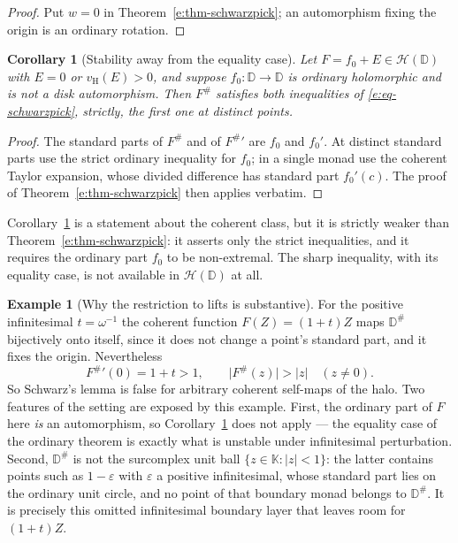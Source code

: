 \documentclass[11pt,a4paper]{article}
\numberwithin{equation}{section}
\newtheorem{corollary}[theorem]{Corollary}
\theoremstyle{definition}
\newtheorem{example}[theorem]{Example}
\theoremstyle{remark}
\theoremstyle{plain}
\newcommand{\K}{\mathbb K}
\newcommand{\tm}{t}
\newcommand{\halo}[1]{#1^{\#}}
\newcommand{\ev}[1]{#1^{\#}}
\newcommand{\Hc}{\mathcal H}
\newcommand{\vH}{v_{\mathrm H}}
\newcommand{\abs}[1]{\lvert #1\rvert}
\begin{document}
\begin{proof}
Put $w=0$ in Theorem~\ref{e:thm-schwarzpick}; an automorphism fixing the
origin is an ordinary rotation.
\end{proof}

\begin{corollary}[Stability away from the equality case]
\label{e:cor-spstability}
Let $F=f_0+E\in\Hc(\mathbb D)$ with $E=0$ or $\vH(E)>0$, and suppose
$f_0:\mathbb D\to\mathbb D$ is ordinary holomorphic and is \emph{not} a
disk automorphism.  Then $\ev F$ satisfies both inequalities of
\eqref{e:eq-schwarzpick}, strictly, the first one at distinct points.
\end{corollary}

\begin{proof}
The standard parts of $\ev F$ and of $\ev F{}'$ are $f_0$ and $f_0'$.  At
distinct standard parts use the strict ordinary inequality for $f_0$; in a
single monad use the coherent Taylor expansion, whose divided difference
has standard part $f_0'(c)$.  The proof of
Theorem~\ref{e:thm-schwarzpick} then applies verbatim.
\end{proof}

Corollary~\ref{e:cor-spstability} is a statement about the coherent class,
but it is strictly weaker than
Theorem~\ref{e:thm-schwarzpick}: it asserts only the strict inequalities,
and it requires the ordinary part $f_0$ to be non-extremal.  The sharp
inequality, with its equality case, is not available in $\Hc(\mathbb D)$
at all.

\begin{example}[Why the restriction to lifts is substantive]
\label{e:ex-schwarzfail}
For the positive infinitesimal $\tm=\omega^{-1}$ the coherent function
$F(Z)=(1+\tm)Z$ maps $\halo{\mathbb D}$ bijectively onto itself, since it
does not change a point's standard part, and it fixes the origin.
Nevertheless
\[
 \ev F{}'(0)=1+\tm>1,\qquad \abs{\ev F(z)}>\abs z\quad(z\ne0).
\]
So Schwarz's lemma is false for arbitrary coherent self-maps of the halo.
Two features of the setting are exposed by this example.  First, the
ordinary part of $F$ here \emph{is} an automorphism, so
Corollary~\ref{e:cor-spstability} does not apply --- the equality case of
the ordinary theorem is exactly what is unstable under infinitesimal
perturbation.  Second, $\halo{\mathbb D}$ is not the surcomplex unit ball
$\{z\in\K:\abs z<1\}$: the latter contains points such as $1-\varepsilon$
with $\varepsilon$ a positive infinitesimal, whose standard part lies on
the ordinary unit circle, and no point of that boundary monad belongs to
$\halo{\mathbb D}$.  It is precisely this omitted infinitesimal boundary
layer that leaves room for $(1+\tm)Z$.
\end{example}
\end{document}
